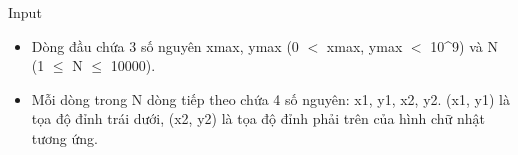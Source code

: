 Input
\begin{itemize}
	\item Dòng đầu chứa 3 số nguyên xmax, ymax (0 $<$ xmax, ymax $<$ 10^9) và N (1  $\le$  N  $\le$  10000).
	\item Mỗi dòng trong N dòng tiếp theo chứa 4 số nguyên: x1, y1, x2, y2. (x1, y1) là tọa độ đỉnh trái dưới, (x2, y2) là tọa độ đỉnh phải trên của hình chữ nhật tương ứng.
\end{itemize}